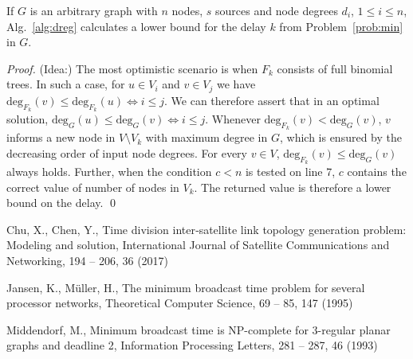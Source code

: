 \begin{proposition}
If $G$ is an arbitrary graph with $n$ nodes, $s$ sources and node degrees $d_i$, $1\leq i\leq n$, Alg.~\ref{alg:dreg} calculates a lower bound for the delay $k$ from Problem~\ref{prob:min} in $G$.
\end{proposition}
\begin{proof}
(Idea:)
The most optimistic scenario is when $F_k$ consists of full binomial trees.
In such a case, for $u\in V_i$ and $v\in V_j$ we have $\text{deg}_{F_k}(v)\leq\text{deg}_{F_k}(u)\Leftrightarrow i\leq j$.
We can therefore assert that in an optimal solution, $\text{deg}_G(u)\leq\text{deg}_G(v)\Leftrightarrow i\leq j$.
Whenever $\text{deg}_{F_k}(v)<\text{deg}_G(v)$, $v$ informs a new node in $V\setminus V_k$ with maximum degree in $G$, which is ensured by the decreasing order of input node degrees.
For every $v\in V$, $\text{deg}_{F_k}(v)\leq \text{deg}_G(v)$ always holds.
Further, when the condition $c<n$ is tested on line 7, $c$ contains the correct value of number of nodes in $V_k$.
The returned value is therefore a lower bound on the delay.
\qed
\end{proof}







\begin{thebibliography}{}
%
%
Chu, X., Chen, Y.,
Time division inter‐satellite link topology generation problem: Modeling and solution,
International Journal of Satellite Communications and Networking, 194 -- 206, 36 (2017)

Jansen, K., M\"uller, H.,
The minimum broadcast time problem for several processor networks, 
Theoretical Computer Science, 69 -- 85, 147 (1995)

Middendorf, M.,
Minimum broadcast time is NP-complete for 3-regular planar graphs and deadline 2,
Information Processing Letters, 281 -- 287, 46 (1993)

\end{thebibliography}



